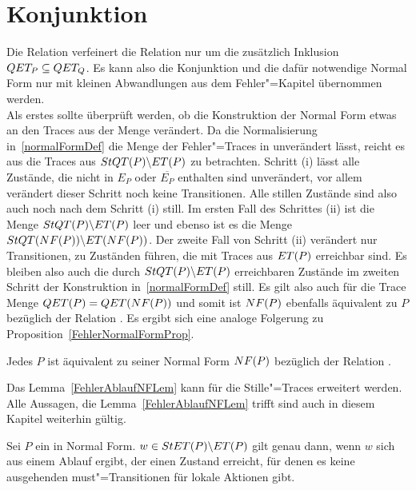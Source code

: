 \section{Konjunktion}

Die Relation \QRel{} verfeinert die Relation \ERel{} nur um die zusätzlich
Inklusion $QET _P \subseteq QET _Q$. Es kann also die Konjunktion und die
dafür notwendige Normal Form nur mit kleinen Abwandlungen aus dem
Fehler"=Kapitel übernommen werden.\\
Als erstes sollte überprüft werden, ob die Konstruktion der Normal Form etwas
an den Traces aus der Menge \QET{} verändert. Da die Normalisierung
in~\ref{normalFormDef} die Menge der Fehler"=Traces in \ET{} unverändert lässt,
reicht es aus die Traces aus $StQT (P)\backslash ET (P)$ zu betrachten.
Schritt (i) lässt alle Zustände, die nicht in $E_P$ oder $\overline{E_P}$
enthalten sind unverändert, vor allem verändert dieser Schritt noch keine
Transitionen. Alle stillen Zustände sind also auch noch nach dem Schritt (i)
still. Im ersten Fall des Schrittes (ii) ist die Menge $StQT (P)\backslash ET
(P)$ leer und ebenso ist es die Menge $StQT (NF (P))\backslash ET (NF (P))$.
Der zweite Fall von Schritt (ii) verändert nur Transitionen, zu Zuständen
führen, die mit Traces aus $ET (P)$ erreichbar sind. Es bleiben also auch die
durch $StQT (P)\backslash ET (P)$ erreichbaren Zustände im zweiten Schritt
der Konstruktion in~\ref{normalFormDef} still. Es gilt also auch für die Trace
Menge \QET{} $QET(P) = QET (NF (P))$ und somit ist $NF (P)$ ebenfalls
äquivalent zu $P$ bezüglich der Relation \QRel{}. Es ergibt sich eine analoge
Folgerung zu Proposition~\ref{FehlerNormalFormProp}.\\

\begin{Prop}
  \label{stilleNormalFormProp}
  Jedes \MEIO{} $P$ ist äquivalent zu seiner Normal Form $NF (P)$ bezüglich
  der Relation \QRel{}.
\end{Prop}

Das Lemma~\ref{FehlerAblaufNFLem} kann für die Stille"=Traces erweitert werden.
Alle Aussagen, die Lemma~\ref{FehlerAblaufNFLem} trifft sind auch in diesem
Kapitel weiterhin gültig.

\begin{Lem}
  Sei $P$ ein \MEIO{} in Normal Form. $w\in StET (P)\backslash ET (P)$ gilt
  genau dann, wenn $w$ sich aus einem Ablauf ergibt, der einen Zustand
  erreicht, für denen es keine ausgehenden must"=Transitionen für lokale
  Aktionen gibt.
\end{Lem}

